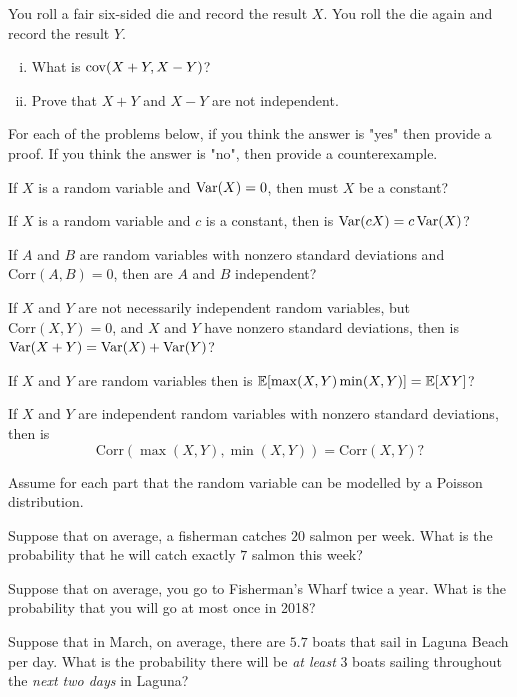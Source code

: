 \documentclass[11pt]{article}
\begin{document}
\begin{Parts}
	\Part You roll a fair six-sided die and record the result $X$. You roll the die again and record the result $Y$. 
	
	\begin{enumerate}[(i)]
		\item What is $\operatorname{cov} (X+Y, X-Y)$? 
		\item Prove that $X+Y$ and $X-Y$ are not independent.
	\end{enumerate}

	
	For each of the problems below, if you think the answer is "yes" then provide a proof. If you think the answer is "no", then provide a counterexample.
	
	\Part If $X$ is a random variable and $\operatorname{Var} (X) = 0$, then must $X$ be a constant?
	

	\Part If $X$ is a random variable and $c$ is a constant, then is $\operatorname{Var} (cX) = c \operatorname{Var} (X)$?
	

	\Part If $A$ and $B$ are random variables with nonzero standard deviations and $\text{Corr} (A, B) = 0$, then are $A$ and $B$ independent?
	

	\Part If $X$ and $Y$ are not necessarily independent random variables, but $\text{Corr} (X, Y) = 0$, and $X$ and $Y$ have nonzero standard deviations, then is $\operatorname{Var} (X+Y) = \operatorname{Var}(X) + \operatorname{Var}(Y)$?
	

	\Part If $X$ and $Y$ are random variables then is $\operatorname{\mathbb{E}}[\max (X, Y) \min (X, Y)] = \operatorname{\mathbb{E}}[X Y]$?
	

	\Part If $X$ and $Y$ are independent random variables with nonzero standard deviations, then is $$\text{Corr} (\max (X, Y), \min (X, Y)) = \text{Corr} (X, Y) ?$$
	
\end{Parts}


Assume for each part that the random variable can be modelled by a Poisson distribution.

\begin{Parts}
	\Part Suppose that on average, a fisherman catches $20$ salmon per week. What is the probability that he will catch exactly $7$ salmon this week?
    
	
	\Part Suppose that on average, you go to Fisherman's Wharf twice a year. What is the probability that you will go at most once in 2018?
    

	\Part Suppose that in March, on average, there are $5.7$ boats that sail in Laguna Beach per day. What is the probability there will be \textit{at least} $3$ boats sailing throughout the \textit{next two days} in Laguna?
    
	
\end{Parts}
\end{document}
